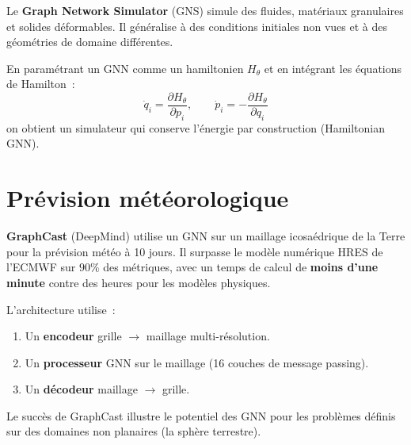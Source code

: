 \begin{exemple}
Le \textbf{Graph Network Simulator} (GNS) simule des fluides,
mat\'eriaux granulaires et solides d\'eformables. Il g\'en\'eralise
\`a des conditions initiales non vues et \`a des g\'eom\'etries
de domaine diff\'erentes.
\end{exemple}

\begin{theoreme}
En param\'etrant un GNN comme un hamiltonien $H_\theta$ et en
int\'egrant les \'equations de Hamilton~:
\[
  \dot{q}_i = \frac{\partial H_\theta}{\partial p_i}, \qquad
  \dot{p}_i = -\frac{\partial H_\theta}{\partial q_i}
\]
on obtient un simulateur qui conserve l'\'energie par construction
(Hamiltonian GNN).
\end{theoreme}

\section{Pr\'evision m\'et\'eorologique}
\label{sec:meteo}

\begin{exemple}
\textbf{GraphCast} (DeepMind) utilise un GNN sur un maillage
icosa\'edrique de la Terre pour la pr\'evision m\'et\'eo \`a 10 jours.
Il surpasse le mod\`ele num\'erique HRES de l'ECMWF sur $90\%$ des
m\'etriques, avec un temps de calcul de \textbf{moins d'une minute}
contre des heures pour les mod\`eles physiques.

L'architecture utilise~:
\begin{enumerate}
  \item Un \textbf{encodeur} grille $\to$ maillage multi-r\'esolution.
  \item Un \textbf{processeur} GNN sur le maillage (16 couches de
        message passing).
  \item Un \textbf{d\'ecodeur} maillage $\to$ grille.
\end{enumerate}
\end{exemple}

\begin{remarque}
Le succ\`es de GraphCast illustre le potentiel des GNN pour les
probl\`emes d\'efinis sur des domaines non planaires (la sph\`ere
terrestre).
\end{remarque}


